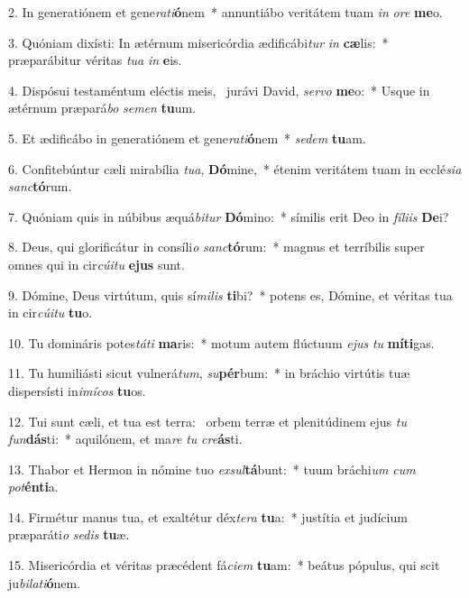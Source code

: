 2. In generatiónem et gene\textit{ra}\textit{ti}\textbf{ó}nem~*  annuntiábo veritátem tuam \textit{in} \textit{o}\textit{re} \textbf{me}o.\

3. Quóniam dixísti: In ætérnum misericórdia ædificábi\textit{tur} \textit{in} \textbf{cæ}lis:~*  præparábitur véritas \textit{tu}\textit{a} \textit{in} \textbf{e}is.\

4. Dispósui testaméntum eléctis meis, \dag\  jurávi David, \textit{ser}\textit{vo} \textbf{me}o:~*  Usque in ætérnum præpará\textit{bo} \textit{se}\textit{men} \textbf{tu}um.\

5. Et ædificábo in generatiónem et gene\textit{ra}\textit{ti}\textbf{ó}nem~*  \textit{se}\textit{dem} \textbf{tu}am.\

6. Confitebúntur cæli mirabília \textit{tu}\textit{a}, \textbf{Dó}mine,~*  étenim veritátem tuam in ecclé\textit{si}\textit{a} \textit{sanc}\textbf{tó}rum.\

7. Quóniam quis in núbibus æquá\textit{bi}\textit{tur} \textbf{Dó}mino:~*  símilis erit Deo in \textit{fí}\textit{li}\textit{is} \textbf{De}i?\

8. Deus, qui glorificátur in consíli\textit{o} \textit{sanc}\textbf{tó}rum:~*  magnus et terríbilis super omnes qui in cir\textit{cú}\textit{i}\textit{tu} \textbf{e}\textbf{jus} sunt.\

9. Dómine, Deus virtútum, quis sí\textit{mi}\textit{lis} \textbf{ti}bi?~*  potens es, Dómine, et véritas tua in cir\textit{cú}\textit{i}\textit{tu} \textbf{tu}o.\

10. Tu domináris potes\textit{tá}\textit{ti} \textbf{ma}ris:~*  motum autem flúctuum \textit{e}\textit{jus} \textit{tu} \textbf{mí}\textbf{ti}gas.\

11. Tu humiliásti sicut vulnerá\textit{tum}, \textit{su}\textbf{pér}bum:~*  in bráchio virtútis tuæ dispersísti in\textit{i}\textit{mí}\textit{cos} \textbf{tu}os.\

12. Tui sunt cæli, et tua est terra: \dag\  orbem terræ et plenitúdinem ejus \textit{tu} \textit{fun}\textbf{dás}ti:~*  aquilónem, et ma\textit{re} \textit{tu} \textit{cre}\textbf{ás}ti.\

13. Thabor et Hermon in nómine tuo \textit{ex}\textit{sul}\textbf{tá}bunt:~*  tuum bráchi\textit{um} \textit{cum} \textit{pot}\textbf{én}\textbf{ti}a.\

14. Firmétur manus tua, et exaltétur déx\textit{te}\textit{ra} \textbf{tu}a:~*  justítia et judícium præparáti\textit{o} \textit{se}\textit{dis} \textbf{tu}æ.\

15. Misericórdia et véritas præcédent fá\textit{ci}\textit{em} \textbf{tu}am:~*  beátus pópulus, qui scit ju\textit{bi}\textit{la}\textit{ti}\textbf{ó}nem.\

